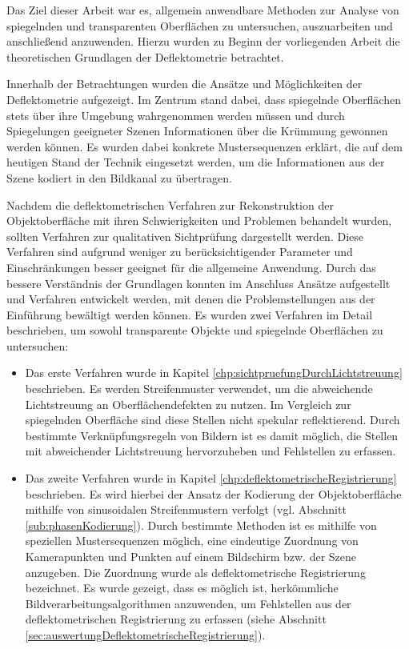 Das Ziel dieser Arbeit war es, allgemein anwendbare Methoden zur Analyse von spiegelnden und transparenten Oberflächen zu untersuchen, auszuarbeiten und anschließend anzuwenden.
Hierzu wurden zu Beginn der vorliegenden Arbeit die theoretischen Grundlagen der Deflektometrie betrachtet.

\p
Innerhalb der Betrachtungen wurden die Ansätze und Möglichkeiten der Deflektometrie aufgezeigt.
Im Zentrum stand dabei, dass spiegelnde Oberflächen stets über ihre Umgebung wahrgenommen werden müssen und durch Spiegelungen geeigneter Szenen Informationen über die Krümmung gewonnen werden können.
Es wurden dabei konkrete Mustersequenzen erklärt, die auf dem heutigen Stand der Technik eingesetzt werden, um die Informationen aus der Szene kodiert in den Bildkanal zu übertragen.

\p
Nachdem die deflektometrischen Verfahren zur Rekonstruktion der Objektoberfläche mit ihren Schwierigkeiten und Problemen behandelt wurden, sollten Verfahren zur qualitativen Sichtprüfung dargestellt werden.
Diese Verfahren sind aufgrund weniger zu be\-rück\-sich\-ti\-gen\-der Parameter und Einschränkungen besser geeignet für die allgemeine Anwendung.
Durch das bessere Verständnis der Grundlagen konnten im Anschluss Ansätze aufgestellt und Verfahren entwickelt werden, mit denen die Problemstellungen aus der Einführung bewältigt werden können.
Es wurden zwei Verfahren im Detail beschrieben, um sowohl transparente Objekte und spiegelnde Oberflächen zu untersuchen:
%
\begin{itemize}
	\item Das erste Verfahren wurde in Kapitel \ref{chp:sichtpruefungDurchLichtstreuung} beschrieben. Es werden Streifenmuster verwendet, um die abweichende Lichtstreuung an Oberflächendefekten zu nutzen. Im Vergleich zur spiegelnden Oberfläche sind diese Stellen nicht spekular reflektierend. Durch bestimmte Verknüpfungsregeln von Bildern ist es damit möglich, die Stellen mit abweichender Lichtstreuung hervorzuheben und Fehlstellen zu erfassen.
	
	\item Das zweite Verfahren wurde in Kapitel \ref{chp:deflektometrischeRegistrierung} beschrieben. Es wird hierbei der Ansatz der Kodierung der Objektoberfläche mithilfe von sinusoidalen Streifenmustern verfolgt (vgl. Abschnitt \ref{sub:phasenKodierung}). Durch bestimmte Methoden ist es mithilfe von speziellen Mustersequenzen möglich, eine eindeutige Zuordnung von Kamerapunkten und Punkten auf einem Bildschirm bzw. der Szene anzugeben. Die Zuordnung wurde als deflektometrische Registrierung bezeichnet. Es wurde gezeigt, dass es möglich ist, herkömmliche Bildverarbeitungsalgorithmen anzuwenden, um Fehlstellen aus der deflektometrischen Registrierung zu erfassen (siehe Abschnitt \ref{sec:auswertungDeflektometrischeRegistrierung}).
\end{itemize}
